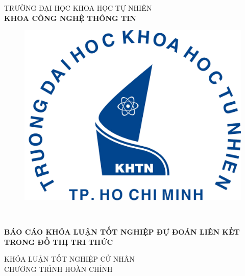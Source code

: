 \begin{titlepage}

\begin{center}
TRƯỜNG ĐẠI HỌC KHOA HỌC TỰ NHIÊN\\
\textbf{KHOA CÔNG NGHỆ THÔNG TIN}\\[2cm]

\begin{figure}[htp]
\centering
\includegraphics[width=8 cm]{images/logo-khtn.png}
{\\[1cm]}
\end{figure}

{ \Large \bfseries \tenSV \\[1cm] } 


{ \Large \bfseries BÁO CÁO KHÓA LUẬN TỐT NGHIỆP ĐỰ ĐOÁN LIÊN KẾT TRONG ĐỒ THỊ TRI THỨC\\[2cm]} 


\large KHÓA LUẬN TỐT NGHIỆP CỬ NHÂN\\
\large CHƯƠNG TRÌNH HOÀN CHỈNH\\




\end{center}
\end{titlepage}
